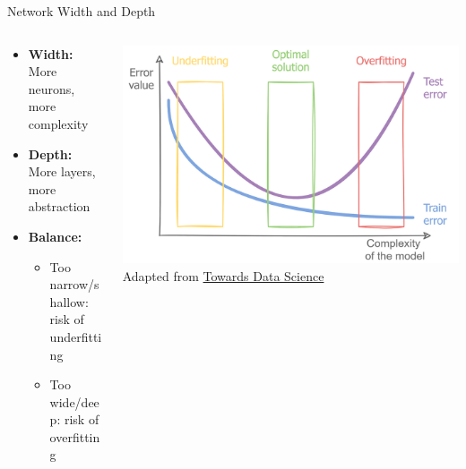 \documentclass[serif, aspectratio=169]{beamer}
\begin{document}
\begin{frame}[t]{Network Width and Depth}
	\begin{columns}
		\begin{column}{0.6\textwidth}
			\begin{itemize}
				\item \textbf{Width:} More neurons, more complexity
				\item \textbf{Depth:} More layers, more abstraction
				\item \textbf{Balance:} 
				      \begin{itemize}
				      	\item Too narrow/shallow: risk of underfitting
				      	\item Too wide/deep: risk of overfitting
				      \end{itemize}
			\end{itemize}
		\end{column}
		\begin{column}{0.5\textwidth}
			\begin{center}
				\includegraphics[keepaspectratio, width=\textwidth]{pic/3/complexity.png} \\
				{\scriptsize Adapted from \href{https://towardsdatascience.com/overfitting-and-underfitting-principles-ea8964d9c45c}{Towards Data Science}}
			\end{center}
		\end{column}
	\end{columns}
\end{frame}

\end{document}
